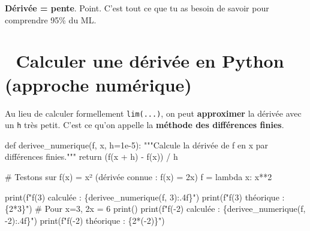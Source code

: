 \documentclass[
  french,
  11pt,
  a4paper,
]{scrbook}
\newenvironment{Shaded}{}{}
\newcommand{\BuiltInTok}[1]{\textcolor[rgb]{0.84,0.23,0.29}{#1}}
\newcommand{\CommentTok}[1]{\textcolor[rgb]{0.42,0.45,0.49}{#1}}
\newcommand{\ControlFlowTok}[1]{\textcolor[rgb]{0.84,0.23,0.29}{#1}}
\newcommand{\DecValTok}[1]{\textcolor[rgb]{0.00,0.36,0.77}{#1}}
\newcommand{\FloatTok}[1]{\textcolor[rgb]{0.00,0.36,0.77}{#1}}
\newcommand{\KeywordTok}[1]{\textcolor[rgb]{0.84,0.23,0.29}{#1}}
\newcommand{\NormalTok}[1]{\textcolor[rgb]{0.14,0.16,0.18}{#1}}
\newcommand{\OperatorTok}[1]{\textcolor[rgb]{0.14,0.16,0.18}{#1}}
\newcommand{\SpecialCharTok}[1]{\textcolor[rgb]{0.00,0.36,0.77}{#1}}
\newcommand{\SpecialStringTok}[1]{\textcolor[rgb]{0.01,0.18,0.38}{#1}}
\begin{document}
\begin{tcolorbox}[enhanced jigsaw, arc=.35mm, bottomrule=.15mm, bottomtitle=1mm, breakable, colback=white, colbacktitle=quarto-callout-tip-color!10!white, colframe=quarto-callout-tip-color-frame, coltitle=black, left=2mm, leftrule=.75mm, opacityback=0, opacitybacktitle=0.6, rightrule=.15mm, title=\textcolor{quarto-callout-tip-color}{\faLightbulb}\hspace{0.5em}{🧠 À retenir}, titlerule=0mm, toprule=.15mm, toptitle=1mm]

\textbf{Dérivée = pente}. Point. C'est tout ce que tu as besoin de
savoir pour comprendre 95\% du ML.

\end{tcolorbox}

\section{🐍 Calculer une dérivée en Python (approche
numérique)}\label{calculer-une-duxe9rivuxe9e-en-python-approche-numuxe9rique}

Au lieu de calculer formellement \texttt{lim(...)}, on peut
\textbf{approximer} la dérivée avec un \texttt{h} très petit. C'est ce
qu'on appelle la \textbf{méthode des différences finies}.

\begin{Shaded}
\begin{Highlighting}[]
\KeywordTok{def}\NormalTok{ derivee\_numerique(f, x, h}\OperatorTok{=}\FloatTok{1e{-}5}\NormalTok{):}
    \CommentTok{"""Calcule la dérivée de f en x par différences finies."""}
    \ControlFlowTok{return}\NormalTok{ (f(x }\OperatorTok{+}\NormalTok{ h) }\OperatorTok{{-}}\NormalTok{ f(x)) }\OperatorTok{/}\NormalTok{ h}

\CommentTok{\# Testons sur f(x) = x² (dérivée connue : f\textquotesingle{}(x) = 2x)}
\NormalTok{f }\OperatorTok{=} \KeywordTok{lambda}\NormalTok{ x: x}\OperatorTok{**}\DecValTok{2}

\BuiltInTok{print}\NormalTok{(}\SpecialStringTok{f"f\textquotesingle{}(3) calculée   : }\SpecialCharTok{\{}\NormalTok{derivee\_numerique(f, }\DecValTok{3}\NormalTok{)}\SpecialCharTok{:.4f\}}\SpecialStringTok{"}\NormalTok{)}
\BuiltInTok{print}\NormalTok{(}\SpecialStringTok{f"f\textquotesingle{}(3) théorique  : }\SpecialCharTok{\{}\DecValTok{2}\OperatorTok{*}\DecValTok{3}\SpecialCharTok{\}}\SpecialStringTok{"}\NormalTok{)  }\CommentTok{\# Pour x=3, 2x = 6}
\BuiltInTok{print}\NormalTok{()}
\BuiltInTok{print}\NormalTok{(}\SpecialStringTok{f"f\textquotesingle{}({-}2) calculée  : }\SpecialCharTok{\{}\NormalTok{derivee\_numerique(f, }\OperatorTok{{-}}\DecValTok{2}\NormalTok{)}\SpecialCharTok{:.4f\}}\SpecialStringTok{"}\NormalTok{)}
\BuiltInTok{print}\NormalTok{(}\SpecialStringTok{f"f\textquotesingle{}({-}2) théorique : }\SpecialCharTok{\{}\DecValTok{2}\OperatorTok{*}\NormalTok{(}\OperatorTok{{-}}\DecValTok{2}\NormalTok{)}\SpecialCharTok{\}}\SpecialStringTok{"}\NormalTok{)}
\end{Highlighting}
\end{Shaded}
\end{document}
